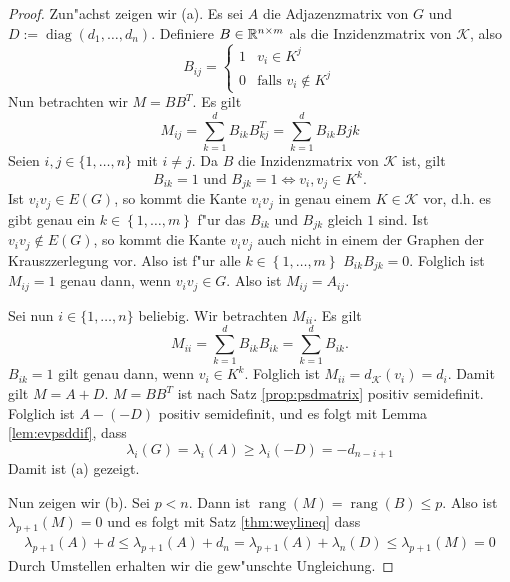 \begin{proof}
  Zun"achst zeigen wir (a). Es sei $A$ die Adjazenzmatrix von $G$ und $D := \operatorname{diag}(d_1,\dots,d_n)$. Definiere $B\in{\mathbb{R}}^{n\times m}$ als die Inzidenzmatrix von $\mathcal K$, also $$B_{ij} = \begin{cases}
    1 & v_i \in K^j \\ 0 & \text{falls }v_i \notin K^j
  \end{cases}$$ 
  Nun betrachten wir $M=BB^{T}$. Es gilt
  \[
    M_{ij} = \sum\limits_{k=1}^{d}B_{ik}B^{T}_{kj} = \sum\limits_{k=1}^{d}B_{ik}B{jk}
  \]
  Seien $i,j \in \{1,\dots,n\}$ mit $i\neq j$. Da $B$ die Inzidenzmatrix von $\mathcal{K}$ ist, gilt  $$ B_{ik} = 1 \text{ und } B_{jk} = 1 \Leftrightarrow v_i,v_j \in K^{k}.$$ Ist $v_iv_j \in E(G)$, so kommt die Kante $v_iv_j$ in genau einem $K\in \mathcal{K}$ vor, d.h. es gibt genau ein $k\in \left\{ 1,\dots,m \right\}$ f"ur das $B_{ik}$ und $B_{jk}$ gleich $1$ sind. Ist $v_iv_j\notin E(G)$, so kommt die Kante $v_iv_j$ auch nicht in einem der Graphen der Krauszzerlegung vor.
  Also ist f"ur alle $k\in \left\{ 1,\dots, m \right\}$ $B_{ik}B_{jk} = 0$. Folglich ist $M_{ij}=1$ genau dann, wenn $v_iv_j\in G$. Also ist $M_{ij} = A_{ij}$.
  
  Sei nun $i\in\{1,\dots,n\}$ beliebig. Wir betrachten $M_{ii}$. Es gilt 
  \[
    M_{ii} = \sum\limits_{k=1}^{d}B_{ik}B_{ik} = \sum\limits_{k=1}^{d} B_{ik}.
  \]
  $B_{ik}=1$ gilt genau dann, wenn $v_i \in K^k$. Folglich ist $M_{ii}= d_{\mathcal{K}}(v_i)= d_i$. Damit gilt $M=A+D$. $M=BB^{T}$ ist nach Satz \ref{prop:psdmatrix} positiv semidefinit.
  Folglich ist $A- (-D)$ positiv semidefinit, und es folgt mit Lemma \ref{lem:evpsddif}, dass 
  \begin{equation*}
    \lambda_i(G) = \lambda_i(A) \geq \lambda_i(-D) = -d_{n-i+1}
  \end{equation*}
  Damit ist (a) gezeigt.

  Nun zeigen wir (b). Sei $p<n$. Dann ist $\operatorname{rang}(M)= \operatorname{rang}(B) \leq p$. Also ist $\lambda_{p+1}(M) = 0$ und es folgt mit Satz \ref{thm:weylineq} dass 
  \begin{align*}
    \lambda_{p+1}(A) + d \leq \lambda_{p+1}(A) + d_{n} = \lambda_{p+1}(A) + \lambda_{n} (D) \leq \lambda_{p+1} (M) = 0
  \end{align*}
  Durch Umstellen erhalten wir die gew"unschte Ungleichung.
\end{proof}

